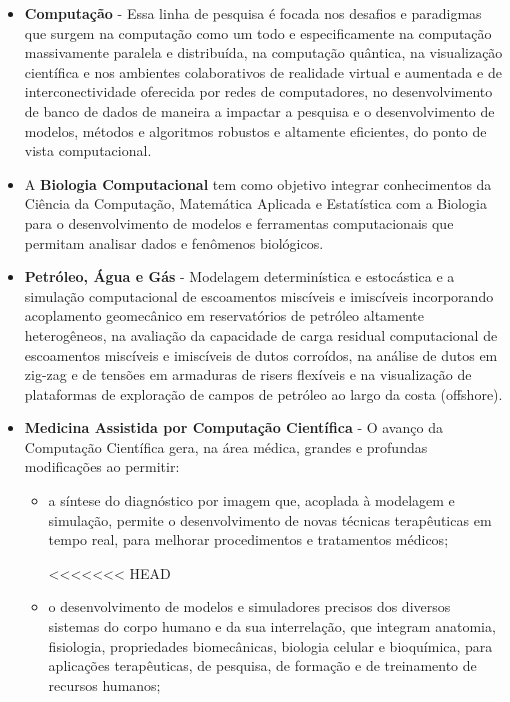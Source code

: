 \begin{itemize}
	\item \textbf{Computação} - Essa linha de pesquisa é focada nos desafios e
		paradigmas que surgem na computação como um todo e especificamente na
		computação massivamente paralela e distribuída, na computação quântica,
		na visualização científica e nos ambientes colaborativos de realidade
		virtual e aumentada e de interconectividade oferecida por redes de
		computadores, no desenvolvimento de banco de dados de maneira a impactar
		a pesquisa e o desenvolvimento de modelos, métodos e algoritmos robustos
		e altamente eficientes, do ponto de vista computacional.

	\item A \textbf{Biologia Computacional} tem como objetivo integrar
		conhecimentos da Ciência da Computação, Matemática Aplicada e
		Estatística com a Biologia para o desenvolvimento de modelos e
		ferramentas computacionais que permitam analisar dados e fenômenos
		biológicos. 

	\item \textbf{Petróleo, Água e Gás} - Modelagem determinística e estocástica
		e a simulação computacional de escoamentos miscíveis e imiscíveis
		incorporando acoplamento geomecânico em reservatórios de petróleo
		altamente heterogêneos, na avaliação da capacidade de carga residual
		computacional de escoamentos miscíveis e imiscíveis de dutos corroídos,
		na análise de dutos em zig-zag e de tensões em armaduras de risers
		flexíveis e na visualização de plataformas de exploração de campos de
		petróleo ao largo da costa (offshore).

	\item \textbf{Medicina Assistida por Computação Científica} - O avanço da
		Computação Científica gera, na área médica, grandes e profundas
		modificações ao permitir:
		\begin{itemize}

			\item a síntese do diagnóstico por imagem que, acoplada à modelagem
				e simulação, permite o desenvolvimento de novas técnicas
				terapêuticas em tempo real, para melhorar procedimentos e
				tratamentos médicos;

<<<<<<< HEAD
			\item o desenvolvimento de modelos e simuladores
				precisos dos diversos sistemas do corpo
				humano e da sua interrelação, que
				integram anatomia, fisiologia,
				propriedades biomecânicas, biologia
				celular e bioquímica, para aplicações
				terapêuticas, de pesquisa, de formação e
				de treinamento de recursos humanos;


\end{itemize}
\end{itemize}
